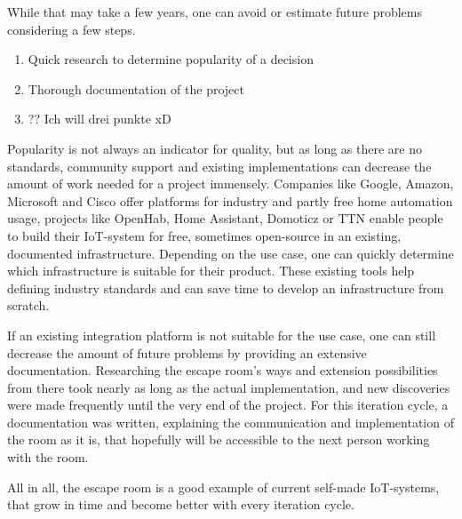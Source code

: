 While that may take a few years, one can avoid or estimate future problems considering a few steps.
\begin{enumerate}
    \item Quick research to determine popularity of a decision
    \item Thorough documentation of the project
    \item ?? Ich will drei punkte xD
\end{enumerate}

Popularity is not always an indicator for quality, but as long as there are no standards,
community support and existing implementations can decrease the amount of work needed for a project immensely.
Companies like Google, Amazon, Microsoft and Cisco 
offer platforms for industry and partly free home automation usage, 
projects like OpenHab, Home Assistant, Domoticz or TTN 
enable people to build their IoT-system for free, sometimes open-source in an existing, documented infrastructure.
Depending on the use case, one can quickly determine which infrastructure is suitable for their product.
These existing tools help defining industry standards and can save time to develop an infrastructure from scratch.

If an existing integration platform is not suitable for the use case, one can still decrease the amount of future problems by providing an extensive documentation.
Researching the escape room's ways and extension possibilities from there took nearly as long as the actual implementation, 
and new discoveries were made frequently until the very end of the project. 
For this iteration cycle, a documentation was written, 
explaining the communication and implementation of the room as it is, 
that hopefully will be accessible to the next person working with the room.

All in all, the escape room is a good example of current self-made IoT-systems, 
that grow in time and become better with every iteration cycle.








